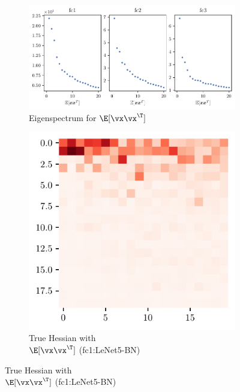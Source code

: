 \begin{figure}[ht]
    \centering
\begin{subfigure}[b]{0.5\textwidth}
    \includegraphics[width=\textwidth]{Appendix_Figures/Explanation_LeNet5Case/BN/sigvals_xxt_t20_CIFAR10_Exp1_LeNet5_BN_nl_fixlr0.01R2_E-1.pdf}
    \caption{Eigenspectrum for $\E[\vx\vx^\T]$}
    \label{fig:app_exp_bn_xxT_fc_eigenspec}
\end{subfigure}%
\begin{subfigure}[b]{0.25\textwidth}
    \includegraphics[width=\textwidth]{Appendix_Figures/Explanation_LeNet5Case/BN/xxT_Trueest_real_corr_expand_t20_CIFAR10_Exp1_LeNet5_BN_nl_fixlr0.01R2_E-1_fc1.pdf}
    \caption{True Hessian with\\ $\E[\vx\vx^\T]$ (fc1:LeNet5-BN)}

\end{subfigure}
\end{figure}

